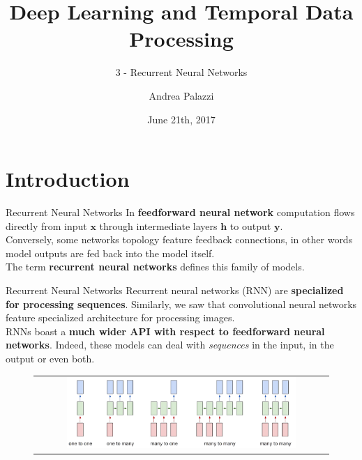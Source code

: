 \documentclass[aspectratio=169]{beamer}
\title[Deep Learning and Temporal Data Processing]{Deep Learning and Temporal Data Processing}
\subtitle{3 - Recurrent Neural Networks}
\institute{University of Modena and Reggio Emilia}
\author{Andrea Palazzi}
\date{June 21th, 2017}
\def\thisframelogos{}
\newcommand{\framelogo}[1]{\def\thisframelogos{#1}}
\begin{document}
\framelogo{img/template/logo_unimore_white.png}





\section{Introduction}


\begin{frame}{Recurrent Neural Networks}
In \textbf{feedforward neural network} computation flows directly from input $\bm{x}$ through intermediate layers $\bm{h}$ to output $\bm{y}$.\\
\vspace{0.5cm}
Conversely, some networks topology feature feedback connections, in other words model outputs are fed back into the model itself.\\
\vspace{0.5cm}
The term \textbf{recurrent neural networks} defines this family of models.

\end{frame}


\begin{frame}{Recurrent Neural Networks}
Recurrent neural networks (RNN) are \textbf{specialized for processing sequences}. Similarly, we saw that convolutional neural networks feature specialized architecture for processing images.\\
\vspace{0.4cm}
RNNs boast a \textbf{much wider API with respect to feedforward neural networks}. Indeed, these models can deal with \textit{sequences} in the input, in the output or even both.
\begin{figure}
\begin{tabular}{c}
\includegraphics[width=0.8\textwidth]{img/rnn/rnn_api.png}
\end{tabular}
\end{figure}
\end{frame}
\end{document}
